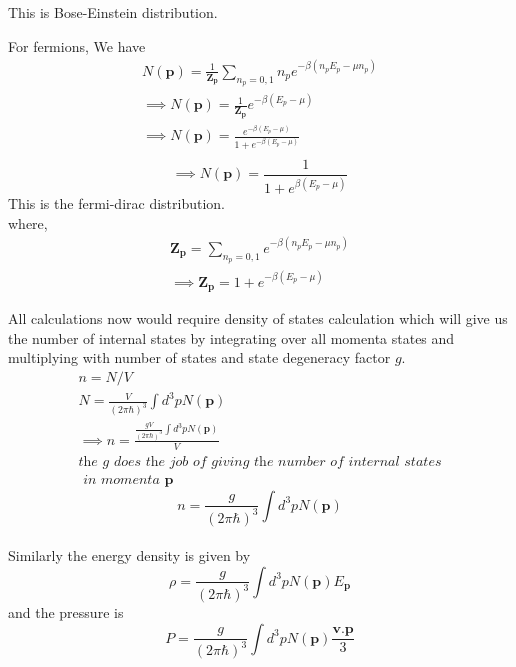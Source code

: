 \documentclass[12pt]{report}
\newcommand{\mbf}[1]{\mathbf{#1}}
\newcommand{\tit}[1]{\textit{#1}}
\begin{document}
This is Bose-Einstein distribution.

For fermions, We have 
\begin{eqnarray*}
N(\mbf{p})= \frac{1}{\mbf{Z_p}}\sum_{n_p=0,1}n_pe^{-\beta(n_pE_p-\mu n_p)} \\
\implies N(\mbf{p})= \frac{1}{\mbf{Z_p}} e^{-\beta(E_p-\mu)} \\ 
\implies N(\mbf{p})= \frac{e^{-\beta(E_p-\mu)}}{1 + e^{-\beta(E_p-\mu)}}  \\ 
\end{eqnarray*}
\begin{equation}
\implies N(\mbf{p})= \frac{1}{1 + e^{\beta(E_p-\mu)}} 
\end{equation}
This is the fermi-dirac distribution.\\
where,
\begin{eqnarray*}
\mbf{Z_p}= \sum_{n_p=0,1}e^{-\beta(n_pE_p-\mu n_p)}\\
\implies \mbf{Z_p}= 1 + e^{-\beta(E_p-\mu)}
\end{eqnarray*} 

All calculations now would require density of states calculation which will give us the number of internal states by integrating over all momenta states and multiplying with number of states and state degeneracy factor $g$.
\begin{eqnarray*}
n=N/V\\
N=\frac{V}{(2 \pi \hbar)^3} \int d^3p N(\mbf{p})\\
\implies n= \frac{\frac{g V}{(2 \pi \hbar)^3} \int d^3p N(\mbf{p})}{V}\\
\tit{the  $g$  does the  job of giving the number of internal states}\\ 
\tit{ in momenta $\mbf{p}$ }
\end{eqnarray*}
\begin{equation}
n= \frac{g }{(2 \pi \hbar)^3} \int d^3p N(\mbf{p})
\end{equation}
\\
Similarly the energy density is given by
\begin{equation}
\rho=\frac{g }{(2 \pi \hbar)^3} \int d^3p N(\mbf{p}) E_{\mbf{p}}
\end{equation}
and the pressure is 
\begin{equation}
P=\frac{g }{(2 \pi \hbar)^3} \int d^3p N(\mbf{p}) \frac{\mbf{v.p}}{3}
\end{equation}
\end{document}
